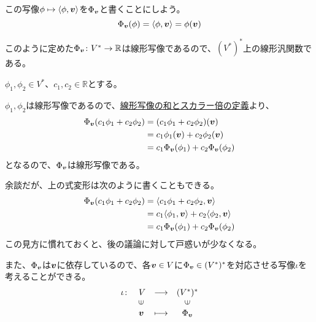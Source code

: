 \documentclass[../../../topic_linear-algebra]{subfiles}
\begin{document}
この写像$\phi \mapsto \langle \phi, \vb*{v} \rangle$を$\Phi_{\vb*{v}}$と書くことにしよう。
\begin{equation*}
  \Phi_{\vb*{v}}(\phi) = \langle \phi, \vb*{v} \rangle = \phi(\vb*{v})
\end{equation*}

このように定めた$\Phi_{\vb*{v}} \colon V^* \to \mathbb{R}$は線形写像であるので、$(V^*)^*$上の線形汎関数である。

\br

\begin{handout}
  $\phi_1, \phi_2 \in V^*$、$c_1, c_2 \in \mathbb{R}$とする。
  
  $\phi_1, \phi_2$は線形写像であるので、\hyperref[def:linear-map-addition-scalar]{線形写像の和とスカラー倍の定義}より、
  \begin{align*}
    \Phi_{\vb*{v}}(c_1 \phi_1 + c_2 \phi_2) &= (c_1\phi_1 + c_2\phi_2)(\vb*{v}) \\
    &= c_1\phi_1(\vb*{v}) + c_2\phi_2(\vb*{v}) \\
    &= c_1\Phi_{\vb*{v}}(\phi_1) + c_2\Phi_{\vb*{v}}(\phi_2)
  \end{align*}
  となるので、$\Phi_{\vb*{v}}$は線形写像である。
  
  \br
  
  余談だが、上の式変形は次のように書くこともできる。
  \begin{align*}
    \Phi_{\vb*{v}}(c_1 \phi_1 + c_2 \phi_2) &= \langle c_1 \phi_1 + c_2 \phi_2, \vb*{v} \rangle \\
    &= c_1 \langle \phi_1, \vb*{v} \rangle + c_2 \langle \phi_2, \vb*{v} \rangle \\
    &= c_1 \Phi_{\vb*{v}}(\phi_1) + c_2 \Phi_{\vb*{v}}(\phi_2)
  \end{align*}
  この見方に慣れておくと、後の議論に対して戸惑いが少なくなる。
\end{handout}

\br

また、$\Phi_{\vb*{v}}$は$\vb*{v}$に依存しているので、各$\vb*{v} \in V$に$\Phi_{\vb*{v}} \in (V^*)^*$を対応させる写像$\iota$を考えることができる。
\begin{equation*}
  \begin{array}{lllc}
    \iota \colon & V         & \longrightarrow & (V^*)^*          \\
            & \rotatebox{90}{$\in$} &                 & \rotatebox{90}{$\in$} \\
            & \vb*{v}               & \longmapsto     & \Phi_{\vb*{v}}
  \end{array}
\end{equation*}
\end{document}
